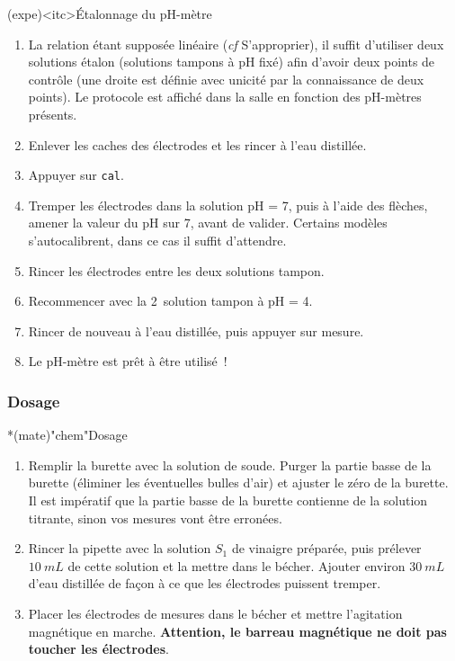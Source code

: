 \documentclass[../main/main.tex]{subfiles}
\begin{document}
\begin{tcb}(expe)<itc>{Étalonnage du pH-mètre}
	\begin{enumerate}
		\item La relation étant supposée linéaire (\textit{cf} S'approprier), il
		      suffit d'utiliser deux solutions étalon (solutions tampons à pH fixé)
		      afin d'avoir deux points de contrôle (une droite est définie avec
		      unicité par la connaissance de deux points). Le protocole est affiché
		      dans la salle en fonction des pH-mètres présents.
		\item Enlever les caches des électrodes et les rincer à l'eau distillée.
		\item Appuyer sur \texttt{cal}.
		\item Tremper les électrodes dans la solution pH = 7, puis à l'aide des
		      flèches, amener la valeur du pH sur 7, avant de valider. Certains
		      modèles s'autocalibrent, dans ce cas il suffit d'attendre.
		\item Rincer les électrodes entre les deux solutions tampon.
		\item Recommencer avec la 2\ieme\ solution tampon à pH = 4.
		\item Rincer de nouveau à l'eau distillée, puis appuyer sur mesure.
		\item Le pH-mètre est prêt à être utilisé~!
	\end{enumerate}
\end{tcb}

\subsubsection{Dosage}

\begin{tcb}*(mate)"chem"{Dosage}
	\begin{enumerate}
		\item Remplir la burette avec la solution de soude. Purger la partie basse
		      de la burette (éliminer les éventuelles bulles d'air) et ajuster le zéro
		      de la burette. Il est impératif que la partie basse de la burette
		      contienne de la solution titrante, sinon vos mesures vont être erronées.
		\item Rincer la pipette avec la solution $S_1$ de vinaigre préparée, puis
		      prélever $\SI{10}{mL}$ de cette solution et la mettre dans le bécher.
		      Ajouter environ $\SI{30}{mL}$ d'eau distillée de façon à ce que les
		      électrodes puissent tremper.
		\item Placer les électrodes de mesures dans le bécher et mettre l'agitation
		      magnétique en marche. \textbf{Attention, le barreau magnétique ne doit
			      pas toucher les électrodes}.
	\end{enumerate}
\end{tcb}
\end{document}

